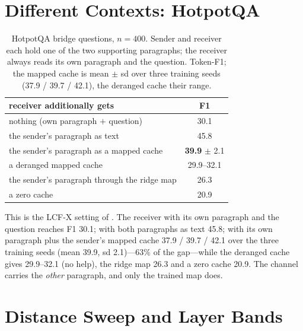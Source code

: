 \documentclass{article}
\begin{document}
\section{Different Contexts: HotpotQA}
\label{app:hotpot}

\begin{table}[h]
\caption{HotpotQA bridge questions, $n = 400$. Sender and receiver each hold one of the two supporting paragraphs; the receiver always reads its own paragraph and the question. Token-F1; the mapped cache is mean $\pm$ sd over three training seeds (37.9 / 39.7 / 42.1), the deranged cache their range.}
\label{tab:hotpot}
\vskip 0.1in
\begin{center}
\begin{small}
\begin{tabular}{lc}
\toprule
receiver additionally gets & F1 \\
\midrule
nothing (own paragraph $+$ question)        & 30.1 \\
the sender's paragraph as text              & 45.8 \\
the sender's paragraph as a mapped cache    & \textbf{39.9} $\pm$ 2.1 \\
a deranged mapped cache                     & 29.9--32.1 \\
the sender's paragraph through the ridge map & 26.3 \\
a zero cache                                & 20.9 \\
\bottomrule
\end{tabular}
\end{small}
\end{center}
\end{table}

This is the LCF-X setting of \citet{2605.22863}. The receiver with its own paragraph and the question reaches F1 30.1; with both paragraphs as text 45.8; with its own paragraph plus the sender's mapped cache 37.9 / 39.7 / 42.1 over the three training seeds (mean 39.9, sd 2.1)---63\% of the gap---while the deranged cache gives 29.9--32.1 (no help), the ridge map 26.3 and a zero cache 20.9. The channel carries the \emph{other} paragraph, and only the trained map does.

\section{Distance Sweep and Layer Bands}
\label{app:distance}
\end{document}
